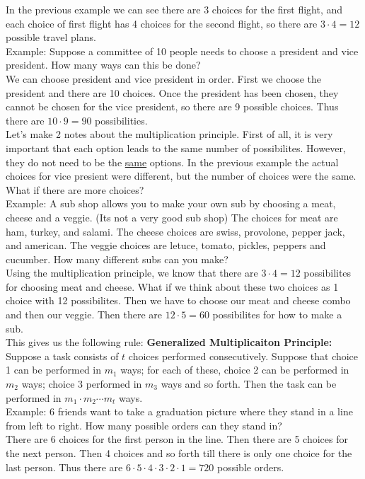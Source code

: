 \documentclass[14,fleqn]{article}
\begin{document}
In the previous example we can see there are 3 choices for the first flight, and each choice of first flight has 4 choices for the second flight, so there are $3\cdot 4=12$ possible travel plans.\\

Example: Suppose a committee of 10 people needs to choose a president and vice president. How many ways can this be done?\\
We can choose president and vice president in order. First we choose the president and there are 10 choices. Once the president has been chosen, they cannot be chosen for the vice president, so there are 9 possible choices. Thus there are $10\cdot 9=90$ possibilities.\\

Let's make 2 notes about the multiplication principle. First of all, it is very important that each option leads to the same number of possibilites. However, they do not need to be the \underline{same} options. In the previous example the actual choices for vice presient were different, but the number of choices were the same.\\

What if there are more choices?\\
Example: A sub shop allows you to make your own sub by choosing a meat, cheese and a veggie. (Its not a very good sub shop) The choices for meat are ham, turkey, and salami. The cheese choices are swiss, provolone, pepper jack, and american. The veggie choices are letuce, tomato, pickles, peppers and cucumber. How many different subs can you make?\\

Using the multiplication principle, we know that there are $3\cdot 4=12$ possibilites for choosing meat and cheese. What if we think about these two choices as 1 choice with 12 possibilites. Then we have to choose our meat and cheese combo and then our veggie. Then there are $12\cdot 5=60$ possibilites for how to make a sub.\\

This gives us the following rule:
\textbf{Generalized Multiplicaiton Principle:} Suppose a task consists of $t$ choices performed consecutively. Suppose that choice 1 can be performed in $m_1$ ways; for each of these, choice 2 can be performed in $m_2$ ways; choice 3 performed in $m_3$ ways and so forth. Then the task can be performed in $m_1\cdot m_2\cdots m_t$ ways.\\

Example: 6 friends want to take a graduation picture where they stand in a line from left to right. How many possible orders can they stand in?\\
There are 6 choices for the first person in the line. Then there are 5 choices for the next person. Then 4 choices and so forth till there is only one choice for the last person. Thus there are $6\cdot 5\cdot 4\cdot 3\cdot 2\cdot 1=720$ possible orders.\\
\end{document}

